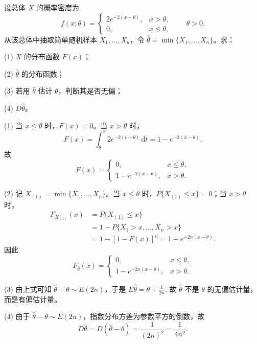 \documentclass[lang=cn,11pt]{elegantbook}
\begin{document}
\begin{exercise}\label{exer:src-2014-spring-a-08}
设总体 \(X\) 的概率密度为
\[
f(x;\theta)=
\begin{cases}
2e^{-2(x-\theta)}, & x>\theta,\\
0, & x\le\theta,
\end{cases}
\qquad \theta>0.
\]
从该总体中抽取简单随机样本 \(X_1,\dots,X_n\)，令 \(\hat\theta=\min\{X_1,\dots,X_n\}\)。求：\par
(1) \(X\) 的分布函数 \(F(x)\)；\par
(2) \(\hat\theta\) 的分布函数；\par
(3) 若用 \(\hat\theta\) 估计 \(\theta\)，判断其是否无偏；\par
(4) \(D\hat\theta\)。
\end{exercise}
\begin{solution}
(1) 当 \(x\le\theta\) 时，\(F(x)=0\)。当 \(x>\theta\) 时，
\[
F(x)=\int_{\theta}^{x}2e^{-2(t-\theta)}\,\mathrm dt
=1-e^{-2(x-\theta)}.
\]
故
\[
F(x)=
\begin{cases}
0, & x\le\theta,\\
1-e^{-2(x-\theta)}, & x>\theta.
\end{cases}
\]

(2) 记 \(X_{(1)}=\min\{X_1,\dots,X_n\}\)。当 \(x\le\theta\) 时，\(P\{X_{(1)}\le x\}=0\)；当 \(x>\theta\) 时，
\[
\begin{aligned}
F_{X_{(1)}}(x)
&=P\{X_{(1)}\le x\}\\
&=1-P\{X_1>x,\dots,X_n>x\}\\
&=1-[1-F(x)]^n
=1-e^{-2n(x-\theta)}.
\end{aligned}
\]
因此
\[
F_{\hat\theta}(x)=
\begin{cases}
0, & x\le\theta,\\
1-e^{-2n(x-\theta)}, & x>\theta.
\end{cases}
\]

(3) 由上式可知 \(\hat\theta-\theta\sim E(2n)\)，于是
\(
E\hat\theta=\theta+\frac1{2n}.
\)
故 \(\hat\theta\) 不是 \(\theta\) 的无偏估计量，而是有偏估计量。

(4) 由于 \(\hat\theta-\theta\sim E(2n)\)，指数分布方差为参数平方的倒数，故
\[
D\hat\theta=D(\hat\theta-\theta)=\frac1{(2n)^2}=\frac1{4n^2}.
\]
\end{solution}
\end{document}
